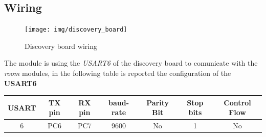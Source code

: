 \subsection{Wiring}
\begin{figure}[H]
	\centering
	\texttt{[image: img/discovery\_board]}
	\caption{Discovery board wiring}
	\label{fig:dicovery}
\end{figure}

The module is using the \textit{USART6} of the discovery board to comunicate with the \textit{room} modules, in the following table is reported the configuration of the \textbf{USART6}
\begin{center}
	\begin{tabular}{||c | c | c | c | c | c | c ||} 
		\hline
		USART 	& TX pin 	& RX pin	& baud-rate & Parity Bit & Stop bits & Control Flow \\ 
		\hline
		6		&	PC6		& PC7 		& 9600 & No & 1 & No	\\ 
		\hline
	\end{tabular}
\end{center}

